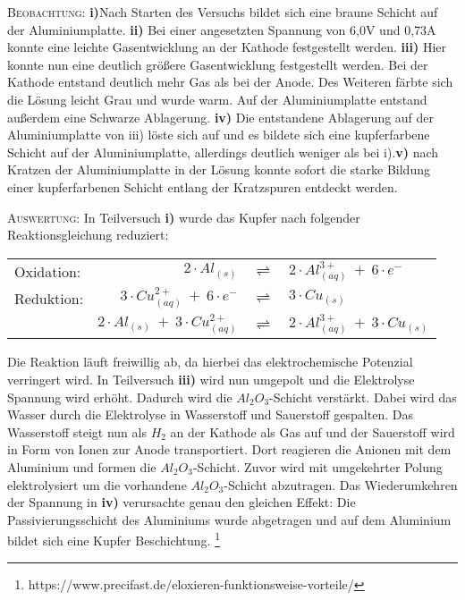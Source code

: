 \documentclass[A4paper, 11p]{article}
\begin{document}
\textsc{Beobachtung:}\hspace{5mm} \textbf{i)}Nach Starten des Versuchs bildet sich eine braune Schicht auf der Aluminiumplatte. \textbf{ii)} Bei einer angesetzten Spannung von 6,0V und 0,73A konnte eine leichte Gasentwicklung an der Kathode festgestellt werden. \textbf{iii)} Hier konnte nun eine deutlich größere Gasentwicklung festgestellt werden. Bei der Kathode entstand deutlich mehr Gas als bei der Anode. Des Weiteren färbte sich die Lösung leicht Grau und wurde warm. Auf der Aluminiumplatte entstand außerdem eine Schwarze Ablagerung. \textbf{iv)} Die entstandene Ablagerung auf der Aluminiumplatte von iii) löste sich auf und es bildete sich eine kupferfarbene Schicht auf der Aluminiumplatte, allerdings deutlich weniger als bei i).\textbf{v)} nach Kratzen der Aluminiumplatte in der Lösung konnte sofort die starke Bildung einer kupferfarbenen Schicht entlang der Kratzspuren entdeckt werden. 

\textsc{Auswertung:}\hspace{8mm} In Teilversuch \textbf{i)} wurde das Kupfer nach folgender Reaktionsgleichung reduziert:

\begin{center}
\begin{tabular}{lrcl}
Oxidation:&$2\cdot Al_{(s)}$&$\rightleftharpoons$&$2\cdot Al^{3+}_{(aq)}\ +\ 6\cdot e^-$\\
Reduktion:&$3\cdot Cu^{2+}_{(aq)}\ +\ 6\cdot e^-$&$\rightleftharpoons$&$3\cdot Cu_{(s)}$\\
\hline
 &$2\cdot Al_{(s)}\ +\ 3\cdot Cu^{2+}_{(aq)}$&$\rightleftharpoons$&$2\cdot Al^{3+}_{(aq)}\ +\ 3\cdot Cu_{(s)}$\\
\end{tabular}
\end{center}
Die Reaktion läuft freiwillig ab, da hierbei das elektrochemische Potenzial verringert wird. In Teilversuch \textbf{iii)} wird nun umgepolt und die Elektrolyse Spannung wird erhöht. Dadurch wird die $Al_2O_3$-Schicht verstärkt. Dabei wird das Wasser durch die Elektrolyse in Wasserstoff und Sauerstoff gespalten. Das Wasserstoff steigt nun als $H_2$ an der Kathode als Gas auf und der Sauerstoff wird in Form von Ionen zur Anode transportiert. Dort reagieren die Anionen mit dem Aluminium und formen die $Al_2O_3$-Schicht. Zuvor wird mit umgekehrter Polung elektrolysiert um die vorhandene $Al_2O_3$-Schicht abzutragen. Das Wiederumkehren der Spannung in \textbf{iv)} verursachte genau den gleichen Effekt: Die Passivierungsschicht des Aluminiums wurde abgetragen und auf dem Aluminium bildet sich eine Kupfer Beschichtung. \footnote{https://www.precifast.de/eloxieren-funktionsweise-vorteile/}
\end{document}
